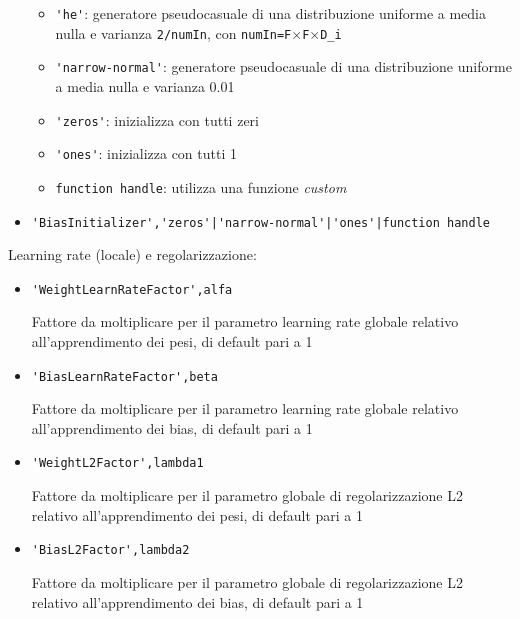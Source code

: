 \begin{itemize}
\begin{itemize}
		\item \verb|'he'|: generatore pseudocasuale di una distribuzione uniforme a media nulla e varianza \verb|2/numIn|, con \verb|numIn=F|$\times$\verb|F|$\times$\verb|D_i|
		
		\item \verb|'narrow-normal'|: generatore pseudocasuale di una distribuzione uniforme a media nulla e varianza 0.01
		
		\item \verb|'zeros'|: inizializza con tutti zeri
		
		\item \verb|'ones'|: inizializza con tutti 1
		
		\item \verb|function handle|: utilizza una funzione \textit{custom}
		
	\end{itemize}
	
	\item \verb+'BiasInitializer','zeros'|'narrow-normal'|'ones'|function handle+
	
\end{itemize}

Learning rate (locale) e regolarizzazione:

\begin{itemize}
	\item \verb|'WeightLearnRateFactor',alfa|
	
	Fattore da moltiplicare per il parametro learning rate globale relativo all'apprendimento dei pesi, di default pari a 1
	
	\item \verb|'BiasLearnRateFactor',beta|
	
	Fattore da moltiplicare per il parametro learning rate globale relativo all'apprendimento dei bias, di default pari a 1
	
	\item \verb|'WeightL2Factor',lambda1|
	
	Fattore da moltiplicare per il parametro globale di regolarizzazione L2 relativo all'apprendimento dei pesi, di default pari a 1
	
	\item \verb|'BiasL2Factor',lambda2|
	
	Fattore da moltiplicare per il parametro globale di regolarizzazione L2 relativo all'apprendimento dei bias, di default pari a 1
	
\end{itemize}

